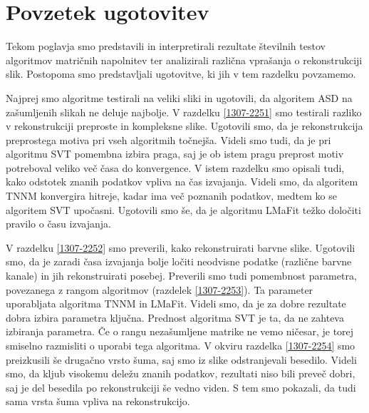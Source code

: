 \section{Povzetek ugotovitev} 
\label{2107-1444}
Tekom poglavja smo predstavili in interpretirali rezultate številnih testov algoritmov matričnih napolnitev ter analizirali različna vprašanja o rekonstrukciji slik. Postopoma smo predstavljali ugotovitve, ki jih v tem razdelku povzamemo.

Najprej smo algoritme testirali na veliki sliki in ugotovili, da algoritem ASD na zašumljenih slikah ne deluje najbolje.  V razdelku \ref{1307-2251} smo testirali razliko v rekonstrukciji preproste in kompleksne slike. Ugotovili smo, da je rekonstrukcija preprostega motiva pri vseh algoritmih točnejša. Videli smo tudi, da je pri algoritmu SVT pomembna izbira praga, saj je ob istem pragu preprost motiv potreboval veliko več časa do konvergence. V istem razdelku smo opisali tudi, kako odstotek znanih podatkov vpliva na čas izvajanja. Videli smo, da algoritem TNNM konvergira hitreje, kadar ima več poznanih podatkov, medtem ko se algoritem SVT upočasni. Ugotovili smo še, da je algoritmu LMaFit težko določiti pravilo o času izvajanja. 

V razdelku \ref{1307-2252} smo preverili, kako rekonstruirati barvne slike. Ugotovili smo, da je zaradi časa izvajanja bolje ločiti neodvisne podatke (različne barvne kanale) in jih rekonstruirati posebej. Preverili smo tudi pomembnost parametra, povezanega z rangom algoritmov (razdelek \ref{1307-2253}). Ta parameter uporabljata algoritma TNNM in LMaFit. Videli smo, da je za dobre rezultate dobra izbira parametra ključna. Prednost algoritma SVT je ta, da ne zahteva izbiranja parametra. Če o rangu nezašumljene matrike ne vemo ničesar, je torej smiselno razmisliti o uporabi tega algoritma. V okviru razdelka \ref{1307-2254} smo preizkusili še drugačno vrsto šuma, saj smo iz slike odstranjevali besedilo. Videli smo, da kljub visokemu deležu znanih podatkov, rezultati niso bili preveč dobri, saj je del besedila po rekonstrukciji še vedno viden. S tem smo pokazali, da tudi sama vrsta šuma vpliva na rekonstrukcijo.


